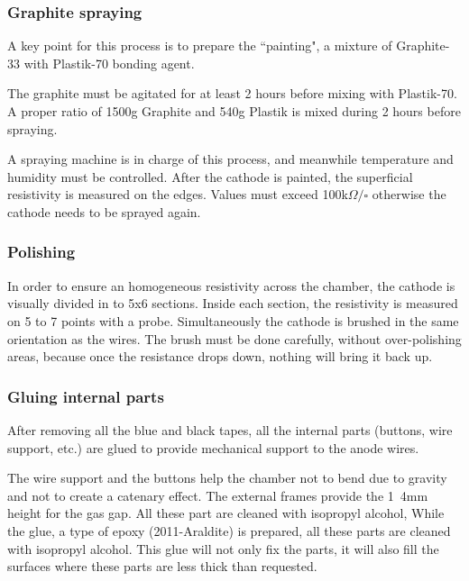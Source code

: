 \subsubsection{Graphite spraying}

A key point for this process is to prepare the ``painting", a mixture of Graphite-33 with Plastik-70 bonding agent.\par

The graphite must be agitated for at least 2 hours before mixing with Plastik-70. A proper ratio of 1500g Graphite and
540g Plastik is mixed during 2 hours before spraying.\par

A spraying machine is in charge of this process, and meanwhile temperature and humidity must be controlled.  After the
cathode is painted, the superficial resistivity is measured on the edges. Values must exceed
\unit{100}{k$\Omega/\square$} otherwise the cathode needs to be sprayed again.\par


\subsubsection{Polishing}

In order to ensure an homogeneous resistivity across the chamber, the cathode is visually divided in to 5x6 sections. Inside
each section, the resistivity is measured on 5 to 7 points with a probe. Simultaneously the cathode is brushed in the
same orientation as the wires. The brush must be done carefully, without over-polishing areas, because once the resistance
drops down, nothing will bring it back up. 


\subsubsection{Gluing internal parts}

After removing all the blue and black tapes, all the internal parts (buttons, wire support, etc.) are glued to provide
mechanical support to the anode wires.\par
The wire support and the buttons help the chamber not to bend due to gravity and not to create a catenary effect.
The external frames provide the \unit{1.4}{mm} height for the gas gap. 
All these part are cleaned with isopropyl alcohol, 
While the glue, a type of epoxy (2011-Araldite) is prepared, all these parts are cleaned with isopropyl alcohol.
This glue will not only fix the parts, it will also fill the surfaces where these parts are less thick than requested.


